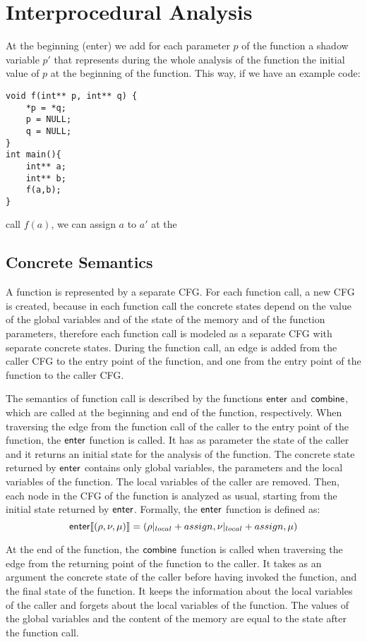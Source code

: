 \section{Interprocedural Analysis}

At the beginning (enter) we add for each parameter $p$ of the function a
shadow variable $p'$ that represents during the whole analysis of the function
the initial value of $p$ at the beginning of the function.
This way, if we have an example code:

\begin{verbatim}
void f(int** p, int** q) {
    *p = *q;
    p = NULL;
    q = NULL;
}
int main(){
    int** a;
    int** b;
    f(a,b);
}
\end{verbatim}

call $f(a)$, we can assign $a$ to $a'$ at the

\subsection{Concrete Semantics}

A function is represented by a separate CFG.
For each function call, a new CFG is created, because in each function call the concrete states
depend on the value of the global variables and of the state of the memory and of the function parameters,
therefore each function call is modeled as a separate CFG with separate concrete states.
During the function call, an edge is added from the caller CFG to the entry point of the function, and one from the entry point
of the function to the caller CFG.

The semantics of function call is described by the functions $\textsf{enter}$ and $\textsf{combine}$, which are called at the beginning and end of the function, respectively.
When traversing the edge from the function call of the caller to the entry point of the function, the $\textsf{enter}$ function is called.
It has as parameter the state of the caller and it returns an initial state for the analysis of the function.
The concrete state returned by $\textsf{enter}$ contains only global variables, the parameters and the local variables of the function.
The local variables of the caller are removed.
Then, each node in the CFG of the function is analyzed as usual,
starting from the initial state returned by $\textsf{enter}$.
Formally, the $\textsf{enter}$ function is defined as:
\[
    \textsf{enter} \llbracket(\rho, \nu, \mu)\rrbracket = (\rho|_{local}+assign,\nu|_{local}+assign, \mu)
\]

At the end of the function, the $\textsf{combine}$ function is called when traversing the edge from the returning point of the function to the caller.
It takes as an argument the concrete state of the caller before having invoked the function,
and the final state of the function.
It keeps the information about the local variables of the caller and forgets about the local variables of the function.
The values of the global variables and the content of the memory are equal to the state after the function call.

